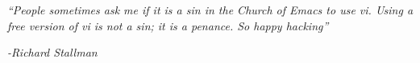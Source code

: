 \clearpage
{}

\begin{center}
\vspace*{11cm}
\textit{``People sometimes ask me if it is a sin in the Church of Emacs to use vi.
	Using a free version of vi is not a sin; it is a penance. So happy hacking''}
\end{center}
\par
\hspace*{7cm}
\textit{-Richard Stallman}
